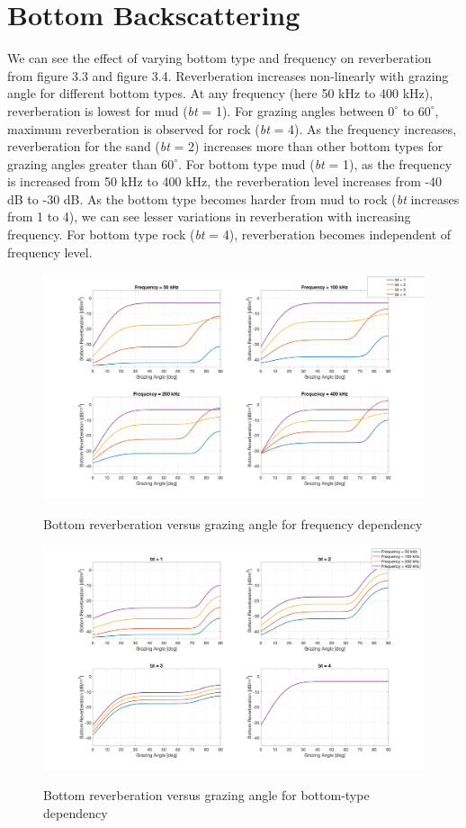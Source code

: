 \newpage

\section{ Bottom Backscattering } \label{ Bottom Backscattering } 
\noindent We can see the effect of varying bottom type and frequency on reverberation from figure 3.3 and figure 3.4. Reverberation increases non-linearly with grazing angle for different bottom types. At any frequency (here 50 kHz to 400 kHz), reverberation is lowest for mud (\textit{bt} = 1). For grazing angles between $0^{\circ}$ to $60^{\circ}$, maximum reverberation is observed for rock (\textit{bt} = 4). As the frequency increases, reverberation for the sand (\textit{bt} = 2) increases more than other bottom types for grazing angles greater than $60^{\circ}$. For bottom type mud (\textit{bt} = 1), as the frequency is increased from 50 kHz to 400 kHz, the reverberation level increases from -40 dB to -30 dB. As the bottom type becomes harder from mud to rock (\textit{bt} increases from 1 to 4), we can see lesser variations in reverberation with increasing frequency. For bottom type rock (\textit{bt} = 4), reverberation becomes independent of frequency level. 

\begin{figure}[H]
\centering
{\includegraphics[scale=0.18]{usp3_3.png}}
\caption{Bottom reverberation versus grazing angle for frequency dependency}
\end{figure}

\begin{figure}[H]
\centering
{\includegraphics[scale=0.18]{usp3_4.png}}
\caption{Bottom reverberation versus grazing angle for bottom-type dependency}
\end{figure}


